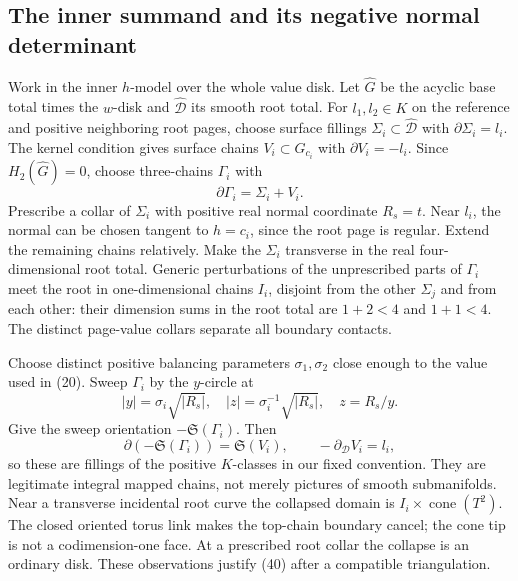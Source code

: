 \documentclass[11pt]{article}
\newcommand{\calD}{\mathcal D}
\begin{document}
\subsection{The inner summand and its negative normal determinant}

Work in the inner \(h\)-model over the whole value disk.
Let \(\widehat G\) be the acyclic base total times the
\(w\)-disk and \(\widehat{\calD}\) its smooth root total.
For \(l_1,l_2\in K\) on the reference and positive neighboring
root pages, choose surface fillings
\(\Sigma_i\subset\widehat{\calD}\) with
\(\partial\Sigma_i=l_i\).
The kernel condition gives surface chains
\(V_i\subset G_{c_i}\) with \(\partial V_i=-l_i\).
Since \(H_2(\widehat G)=0\), choose three-chains \(\Gamma_i\)
with
\[
                      \partial\Gamma_i=\Sigma_i+V_i.             \tag{39}
\]
Prescribe a collar of \(\Sigma_i\) with positive real
normal coordinate \(R_s=t\). Near \(l_i\), the normal
can be chosen tangent to \(h=c_i\), since the root page
is regular. Extend the remaining chains relatively.
Make the \(\Sigma_i\) transverse in the real four-dimensional
root total. Generic perturbations of the unprescribed
parts of \(\Gamma_i\) meet the root in one-dimensional
chains \(I_i\), disjoint from the other \(\Sigma_j\)
and from each other: their dimension sums in the root
total are \(1+2<4\) and \(1+1<4\).
The distinct page-value collars separate all boundary contacts.

Choose distinct positive balancing parameters \(\sigma_1,\sigma_2\)
close enough to the value used in (20). Sweep \(\Gamma_i\)
by the \(y\)-circle at
\[
 |y|=\sigma_i\sqrt{|R_s|},\quad
 |z|=\sigma_i^{-1}\sqrt{|R_s|},\quad z=R_s/y .
\]
Give the sweep orientation \(-\mathfrak S(\Gamma_i)\).
Then
\[
 \partial(-\mathfrak S(\Gamma_i))=\mathfrak S(V_i),
 \qquad -\partial_{\calD}V_i=l_i,                  \tag{40}
\]
so these are fillings of the positive \(K\)-classes in our
fixed convention. They are legitimate integral mapped
chains, not merely pictures of smooth submanifolds.
Near a transverse incidental root curve the collapsed
domain is \(I_i\times\operatorname{cone}(T^2)\).
The closed oriented torus link makes the top-chain
boundary cancel; the cone tip is not a codimension-one
face. At a prescribed root collar the collapse is an
ordinary disk. These observations justify (40) after a
compatible triangulation.
\end{document}
